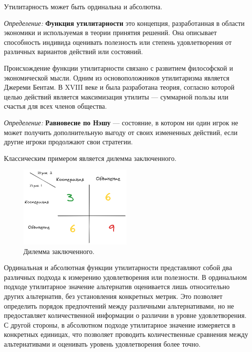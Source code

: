 Утилитарность может быть ординальна и абсолютна.

\textit{Определение:} \textbf{Функция утилитарности} это концепция, разработанная в области экономики и используемая в теории принятия решений.
Она описывает способность индивида оценивать полезность или степень удовлетворения от различных вариантов действий или состояний.

Происхождение функции утилитарности связано с развитием философской и экономической мысли. Одним из основоположников утилитаризма является Джереми Бентам. 
В XVIII веке и была разработана теория, согласно которой целью действий является максимизация утилиты --- суммарной пользы или счастья для всех членов общества.

\textit{Определение:} \textbf{Равновесие по Нэшу} --- состояние, в котором ни один игрок не может получить дополнительную выгоду от своих измененных действий, если другие игроки продолжают свои стратегии.

Классическим примером является дилемма заключенного.

\begin{figure}[h]
    \centering
    \includegraphics[width=0.5\textwidth]{assets/pedagogic/social/dilemma.excalidraw.png}
    \caption{Дилемма заключенного.}
    \label{dilem}
\end{figure}

Ординальная и абсолютная функции утилитарности представляют собой два различных подхода к измерению удовлетворения или полезности. 
В ординальном подходе утилитарное значение альтернатив оценивается лишь относительно других альтернатив, без установления конкретных метрик. 
Это позволяет определить порядок предпочтений между различными альтернативами, но не предоставляет количественной информации о различии в уровне удовлетворения. 
С другой стороны, в абсолютном подходе утилитарное значение измеряется в конкретных единицах, что позволяет проводить количественные сравнения между 
альтернативами и оценивать уровень удовлетворения более точно.

